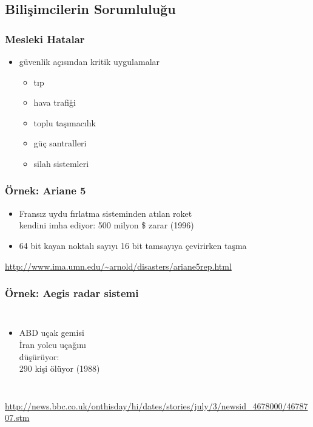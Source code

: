 \documentclass[dvipsnames]{beamer}
\theoremstyle{definition}
\theoremstyle{example}
\theoremstyle{plain}
\begin{document}
\subsection{Bilişimcilerin Sorumluluğu}

\begin{frame}
  \frametitle{Mesleki Hatalar}

  \begin{itemize}
    \item güvenlik açısından kritik uygulamalar
    \begin{itemize}
      \item tıp
      \item hava trafiği
      \item toplu taşımacılık
      \item güç santralleri
      \item silah sistemleri
    \end{itemize}
  \end{itemize}
\end{frame}

\begin{frame}
  \frametitle{Örnek: Ariane 5}

  \begin{center}
  \end{center}

  \begin{itemize}
    \item Fransız uydu fırlatma sisteminden atılan roket\\
      kendini imha ediyor: 500 milyon \$ zarar (1996)

    \item 64 bit kayan noktalı sayıyı 16 bit tamsayıya çevirirken taşma
  \end{itemize}

  \medskip
  \tiny{\url{http://www.ima.umn.edu/~arnold/disasters/ariane5rep.html}}\\
\end{frame}

\begin{frame}
  \frametitle{Örnek: Aegis radar sistemi}

  \begin{columns}

    \begin{itemize}
      \item ABD uçak gemisi\\
        İran yolcu uçağını\\
        düşürüyor:\\
        290 kişi ölüyor (1988)
    \end{itemize}
  \end{columns}

  \medskip
  \tiny{\url{http://news.bbc.co.uk/onthisday/hi/dates/stories/july/3/newsid_4678000/4678707.stm}}\\
\end{frame}
\end{document}
